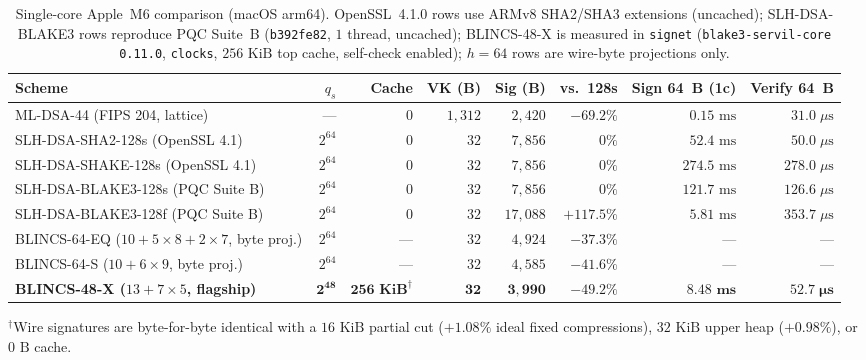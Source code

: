 \documentclass[11pt,a4paper]{article}
\theoremstyle{definition}
\theoremstyle{remark}
\newcommand{\BLINCS}{\textsf{BLINCS-48-X}}
\newcommand{\BLINCSsixfour}{\textsf{BLINCS-64-EQ}}
\newcommand{\BLINCSsixfours}{\textsf{BLINCS-64-S}}
\begin{document}
\begin{table}[t]
\centering
\footnotesize
\setlength{\tabcolsep}{1.8pt}
\caption{Single-core Apple~M6 comparison (macOS arm64). OpenSSL~4.1.0 rows use ARMv8 SHA2/SHA3 extensions (uncached); \textsf{SLH-DSA-BLAKE3} rows reproduce PQC Suite~B (\texttt{b392fe82}, $1$ thread, uncached); \BLINCS{} is measured in \texttt{signet} (\texttt{blake3-servil-core 0.11.0}, \texttt{clocks}, $256\text{ KiB}$ top cache, self-check enabled); $h = 64$ rows are wire-byte projections only.}
\label{tab:compare}
\begin{tabular}{@{}lrrrrrrr@{}}
\toprule
Scheme & $q_s$ & Cache & VK (B) & Sig (B) & vs.\ 128s & Sign 64~B (1c) & Verify 64~B \\
\midrule
\textsf{ML-DSA-44} (FIPS 204, lattice)~\cite{nist2024fips204} & --- & $0$ & $1{,}312$ & $2{,}420$ & $-69.2\%$ & $0.15\text{ ms}$ & $31.0\;\mu\text{s}$ \\
\textsf{SLH-DSA-SHA2-128s} (OpenSSL 4.1) & $2^{64}$ & $0$ & $32$ & $7{,}856$ & $0\%$ & $52.4\text{ ms}$ & $50.0\;\mu\text{s}$ \\
\textsf{SLH-DSA-SHAKE-128s} (OpenSSL 4.1) & $2^{64}$ & $0$ & $32$ & $7{,}856$ & $0\%$ & $274.5\text{ ms}$ & $278.0\;\mu\text{s}$ \\
\textsf{SLH-DSA-BLAKE3-128s} (PQC Suite B) & $2^{64}$ & $0$ & $32$ & $7{,}856$ & $0\%$ & $121.7\text{ ms}$ & $126.6\;\mu\text{s}$ \\
\textsf{SLH-DSA-BLAKE3-128f} (PQC Suite B) & $2^{64}$ & $0$ & $32$ & $17{,}088$ & $+117.5\%$ & $5.81\text{ ms}$ & $353.7\;\mu\text{s}$ \\
\midrule
\BLINCSsixfour{} ($10{+}5{\times}8{+}2{\times}7$, byte proj.) & $2^{64}$ & --- & $32$ & $4{,}924$ & $-37.3\%$ & --- & --- \\
\BLINCSsixfours{} ($10{+}6{\times}9$, byte proj.) & $2^{64}$ & --- & $32$ & $4{,}585$ & $-41.6\%$ & --- & --- \\
\textbf{\BLINCS{} ($13{+}7{\times}5$, flagship)} & $\mathbf{2^{48}}$ & $\mathbf{256\text{ KiB}}^{\dagger}$ & $\mathbf{32}$ & $\mathbf{3{,}990}$ & $\mathbf{-49.2\%}$ & $\mathbf{8.48\text{ ms}}$ & $\mathbf{52.7\;\mu\text{s}}$ \\
\bottomrule
\end{tabular}
\par\vspace{3pt}\noindent
{\scriptsize $^{\dagger}$Wire signatures are byte-for-byte identical with a $16\text{ KiB}$ partial cut ($+1.08\%$ ideal fixed compressions), $32\text{ KiB}$ upper heap ($+0.98\%$), or $0\text{ B}$ cache.}
\end{table}
\end{document}
